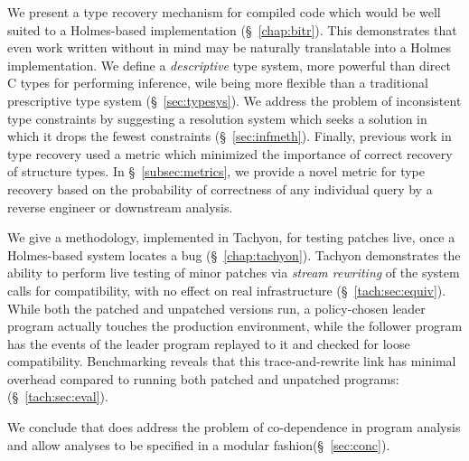 We present a type recovery mechanism for compiled code which would be well suited to a Holmes-based implementation (\S~\ref{chap:bitr}).
This demonstrates that even work written without \sysname in mind may be naturally translatable into a Holmes implementation.
We define a \emph{descriptive} type system, more powerful than direct C types for performing inference, wile being more flexible than a traditional prescriptive type system (\S~\ref{sec:typesys}).
We address the problem of inconsistent type constraints by suggesting a resolution system which seeks a solution in which it drops the fewest constraints (\S~\ref{sec:infmeth}).
Finally, previous work in type recovery used a metric which minimized the importance of correct recovery of structure types.
In \S~\ref{subsec:metrics}, we provide a novel metric for type recovery based on the probability of correctness of any individual query by a reverse engineer or downstream analysis.

We give a methodology, implemented in Tachyon, for testing patches live, once a Holmes-based system locates a bug (\S~\ref{chap:tachyon}).
Tachyon demonstrates the ability to perform live testing of minor patches via \emph{stream rewriting} of the system calls for compatibility, with no effect on real infrastructure (\S~\ref{tach:sec:equiv}).
While both the patched and unpatched versions run, a policy-chosen leader program actually touches the production environment, while the follower program has the events of the leader program replayed to it and checked for loose compatibility.
Benchmarking reveals that this trace-and-rewrite link has minimal overhead compared to running both patched and unpatched programs: (\S~\ref{tach:sec:eval}).

We conclude that \sysname does address the problem of co-dependence in program analysis and allow analyses to be specified in a modular fashion(\S~\ref{sec:conc}).

